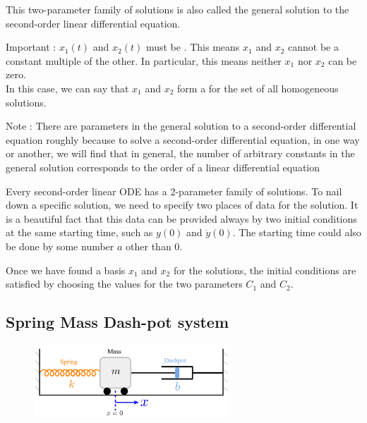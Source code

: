 \documentclass[11pt, openright]{book}
\begin{document}
This two-parameter family of solutions is also called the general solution to the second-order linear differential equation.

\begin{dent}{Important :}
    $x_1(t)$ and $x_2(t)$ must be . This means $x_1$ and $x_2$ cannot be a constant multiple of the other. In particular, this means neither $x_1$ nor $x_2$ can be zero.\\
    In this case, we can say that $x_1$ and $x_2$ form a  for the set of all homogeneous solutions.\\
\end{dent}
\begin{dent}{Note :}
    There are  parameters in the general solution to a second-order differential equation roughly because to solve a second-order differential equation, in one way or another, we will find that in general, the number of arbitrary constants in the general solution corresponds to the order of a linear differential equation
\end{dent}

Every second-order linear ODE has a 2-parameter family of solutions. To nail down a specific solution, we need to specify two places of data for the solution. It is a beautiful fact that this data can be provided always by two initial conditions at the same starting time, such as $y(0)$ and $\dot{y}(0)$. The starting time could also be done by some number $a$ other than $0$.

Once we have found a basis $x_1$ and $x_2$ for the solutions, the initial conditions are satisfied by choosing the values for the two parameters $C_1$ and $C_2$.

\newpage

\subsection{Spring Mass Dash-pot system}

\begin{figure}
    \includegraphics[width=0.65\textwidth]{./documents/l4/SPM-system.png}
\end{figure}
\end{document}
